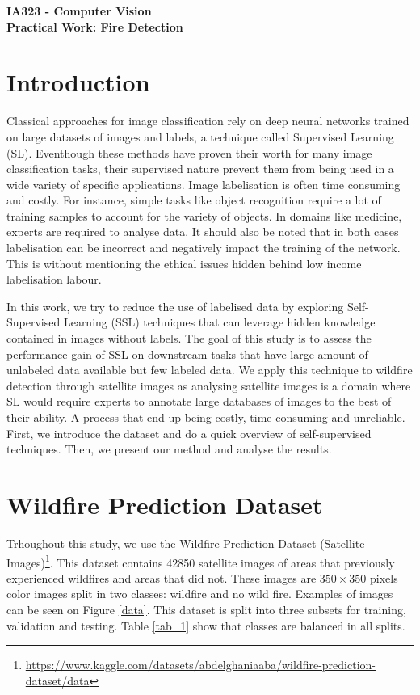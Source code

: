 \documentclass{article}
\begin{document}
\begin{center}
    \baselineskip=25pt
    \textbf{{\Huge IA323 - Computer Vision}}\\
    \textbf{{\Large Practical Work: Fire Detection}}
\end{center}

\section{Introduction}
Classical approaches for image classification rely on deep neural networks trained on large datasets of images and labels, a technique called Supervised Learning (SL). Eventhough these methods have proven their worth for many image classification tasks, their supervised nature prevent them from being used in a wide variety of specific applications. Image labelisation is often time consuming and costly. For instance, simple tasks like object recognition require a lot of training samples to account for the variety of objects. In domains like medicine, experts are required to analyse data. It should also be noted that in both cases labelisation can be incorrect and negatively impact the training of the network. This is without mentioning the ethical issues hidden behind low income labelisation labour.

In this work, we try to reduce the use of labelised data by exploring Self-Supervised Learning (SSL) techniques that can leverage hidden knowledge contained in images without labels. The goal of this study is to assess the performance gain of SSL on downstream tasks that have large amount of unlabeled data available but few labeled data. We apply this technique to wildfire detection through satellite images as analysing satellite images is a domain where SL would require experts to annotate large databases of images to the best of their ability. A process that end up being costly, time consuming and unreliable. First, we introduce the dataset and do a quick overview of self-supervised techniques. Then, we present our method and analyse the results.

\section{Wildfire Prediction Dataset}
Trhoughout this study, we use the Wildfire Prediction Dataset (Satellite Images)\footnote{\url{https://www.kaggle.com/datasets/abdelghaniaaba/wildfire-prediction-dataset/data}}. This dataset contains 42850 satellite images of areas that previously experienced wildfires and areas that did not. These images are \(350 \times 350\) pixels color images split in two classes: wildfire and no wild fire. Examples of images can be seen on Figure \ref{data}. This dataset is split into three subsets for training, validation and testing. Table \ref{tab_1} show that classes are balanced in all splits.
\end{document}

